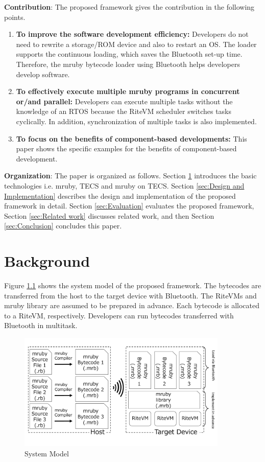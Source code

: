 \documentclass[a4j,12pt,oneside,openany,english]{jsbook}
\begin{document}
{\bf Contribution}: The proposed framework gives the contribution in the following points.
\begin{enumerate}
\item {\bf To improve the software development efficiency:} Developers do not need to rewrite a storage/ROM device and also to restart an OS.
The loader supports the continuous loading, which saves the Bluetooth set-up time.
Therefore, the mruby bytecode loader using Bluetooth helps developers develop software.
\item {\bf To effectively execute multiple mruby programs in concurrent or/and parallel:} Developers can execute multiple tasks without the knowledge of an RTOS because the RiteVM scheduler switches tasks cyclically.
In addition, synchronization of multiple tasks is also implemented.
\item {\bf To focus on the benefits of component-based developments:} This paper shows the specific examples for the benefits of component-based development. 
\end{enumerate}

{\bf Organization}: The paper is organized as follows.
Section \ref{sec:Background} introduces the basic technologies i.e. mruby, TECS and mruby on TECS.
Section \ref{sec:Design and Implementation} describes the design and implementation of the proposed framework in detail.
Section \ref{sec:Evaluation} evaluates the proposed framework, Section \ref{sec:Related work} discusses related work, and then Section \ref{sec:Conclusion} concludes this paper.

\chapter{Background}
\label{sec:Background}
Figure \ref{fig:proposed} shows the system model of the proposed framework.
The bytecodes are transferred from the host to the target device with Bluetooth.
The RiteVMs and mruby library are assumed to be prepared in advance.
Each bytecode is allocated to a RiteVM, respectively.
Developers can run bytecodes transferred with Bluetooth in multitask.

\begin{figure}[t]
    \centering
    \includegraphics[width=10cm,clip]{../EMSOFT2016/figure/proposed.pdf}
    \caption{System Model}
    \label{fig:proposed}
\end{figure}
\end{document}
